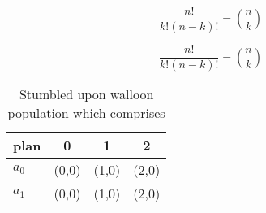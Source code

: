 \documentclass[a4paper]{article}
\begin{document}
\[ \frac{n!}{k!(n-k)!} = \binom{n}{k} \]

\[ \frac{n!}{k!(n-k)!} = \binom{n}{k} \]

\begin{table}
\begin{adjustbox}{width=0.6\columnwidth}
\begin{tabular}{|l|l|l|l|}
\hline
\textbf{plan} & \multicolumn{1}{c|}{\textbf{0}} & \multicolumn{1}{c|}{\textbf{1}} & \multicolumn{1}{c|}{\textbf{2}} \\ \hline
\textbf{$a_0$}  & (0,0) & (1,0) & (2,0) \\ \hline
\textbf{$a_1$}  & (0,0) & (1,0) & (2,0) \\ \hline
\end{tabular}
\end{adjustbox}
\caption{Stumbled upon walloon population which comprises 
}
\end{table}
\end{document}
